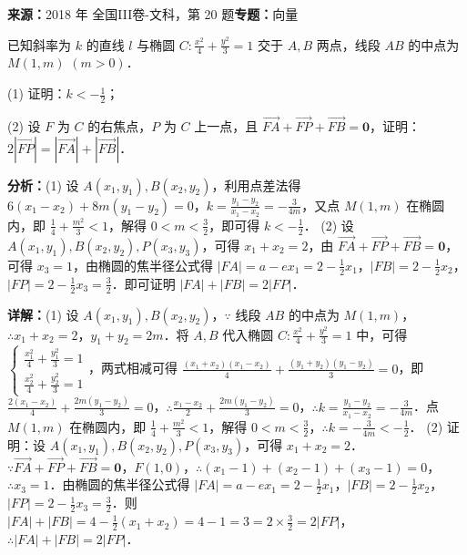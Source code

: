 \begin{question}[points=12]
\textbf{来源：}2018 年 全国III卷-文科，第 20 题\quad \textbf{专题：}向量\par
已知斜率为 $k$ 的直线 $l$ 与椭圆 $C: \frac{x^2}{4}+\frac{y^2}{3}=1$ 交于 $A,B$ 两点，线段 $AB$ 的中点为 $M(1,m)$ $(m>0)$．

(1) 证明：$k<-\frac{1}{2}$；

(2) 设 $F$ 为 $C$ 的右焦点，$P$ 为 $C$ 上一点，且 $\overrightarrow{FA}+\overrightarrow{FP}+\overrightarrow{FB}=\boldsymbol{0}$，证明：$2|\overrightarrow{FP}|=|\overrightarrow{FA}|+|\overrightarrow{FB}|$．
\begin{solution}

\textbf{分析：}(1) 设 $A(x_1,y_1),B(x_2,y_2)$，利用点差法得 $6(x_1-x_2)+8m(y_1-y_2)=0$，$k=\frac{y_1-y_2}{x_1-x_2}=-\frac{3}{4m}$，又点 $M(1,m)$ 在椭圆内，即 $\frac{1}{4}+\frac{m^2}{3}<1$，解得 $0<m<\frac{3}{2}$，即可得 $k<-\frac{1}{2}$．
(2) 设 $A(x_1,y_1),B(x_2,y_2),P(x_3,y_3)$，可得 $x_1+x_2=2$，由 $\overrightarrow{FA}+\overrightarrow{FP}+\overrightarrow{FB}=\boldsymbol{0}$，可得 $x_3=1$，由椭圆的焦半径公式得 $|FA|=a-ex_1=2-\frac{1}{2}x_1$，$|FB|=2-\frac{1}{2}x_2$，$|FP|=2-\frac{1}{2}x_3=\frac{3}{2}$．即可证明 $|FA|+|FB|=2|FP|$．

\textbf{详解：}(1) 设 $A(x_1,y_1),B(x_2,y_2)$，$\because$ 线段 $AB$ 的中点为 $M(1,m)$，$\therefore x_1+x_2=2$，$y_1+y_2=2m$．将 $A,B$ 代入椭圆 $C: \frac{x^2}{4}+\frac{y^2}{3}=1$ 中，可得 $\begin{cases} \frac{x_1^2}{4}+\frac{y_1^2}{3}=1 \\ \frac{x_2^2}{4}+\frac{y_2^2}{3}=1 \end{cases}$，两式相减可得 $\frac{(x_1+x_2)(x_1-x_2)}{4}+\frac{(y_1+y_2)(y_1-y_2)}{3}=0$，即 $\frac{2(x_1-x_2)}{4}+\frac{2m(y_1-y_2)}{3}=0$，$\therefore \frac{x_1-x_2}{2}+\frac{2m(y_1-y_2)}{3}=0$，$\therefore k=\frac{y_1-y_2}{x_1-x_2}=-\frac{3}{4m}$．点 $M(1,m)$ 在椭圆内，即 $\frac{1}{4}+\frac{m^2}{3}<1$，解得 $0<m<\frac{3}{2}$，$\therefore k=-\frac{3}{4m}<-\frac{1}{2}$．
(2) 证明：设 $A(x_1,y_1),B(x_2,y_2),P(x_3,y_3)$，可得 $x_1+x_2=2$．$\because \overrightarrow{FA}+\overrightarrow{FP}+\overrightarrow{FB}=\boldsymbol{0}$，$F(1,0)$，$\therefore (x_1-1)+(x_2-1)+(x_3-1)=0$，$\therefore x_3=1$．由椭圆的焦半径公式得 $|FA|=a-ex_1=2-\frac{1}{2}x_1$，$|FB|=2-\frac{1}{2}x_2$，$|FP|=2-\frac{1}{2}x_3=\frac{3}{2}$．则 $|FA|+|FB|=4-\frac{1}{2}(x_1+x_2)=4-1=3=2\times\frac{3}{2}=2|FP|$，$\therefore |FA|+|FB|=2|FP|$．
\end{solution}
\end{question}

